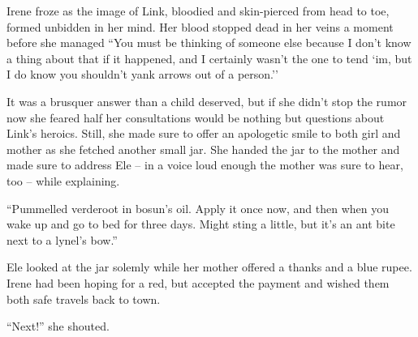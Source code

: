 \documentclass[../FGP.tex]{subfiles}
\begin{document}
\begin{fragment}
Irene froze as the image of Link, bloodied and skin-pierced from head to toe, formed unbidden in her mind. Her blood stopped dead in her veins a moment before she managed ``You must be thinking of someone else because I don't know a thing about that if it happened, and I certainly wasn't the one to tend `im, but I do know you shouldn't yank arrows out of a person.''

It was a brusquer answer than a child deserved, but if she didn't stop the rumor now she feared half her consultations would be nothing but questions about Link's heroics. Still, she made sure to offer an apologetic smile to both girl and mother as she fetched another small jar. She handed the jar to the mother and made sure to address Ele -- in a voice loud enough the mother was sure to hear, too -- while explaining. 

``Pummelled verderoot in bosun's oil. Apply it once now, and then when you wake up and go to bed for three days. Might sting a little, but it's an ant bite next to a lynel's bow.'' 

Ele looked at the jar solemly while her mother offered a thanks and a blue rupee. Irene had been hoping for a red, but accepted the payment and wished them both safe travels back to town. 

``Next!'' she shouted. 
\end{fragment}
\begin{fragment}

\end{fragment}
\end{document}
